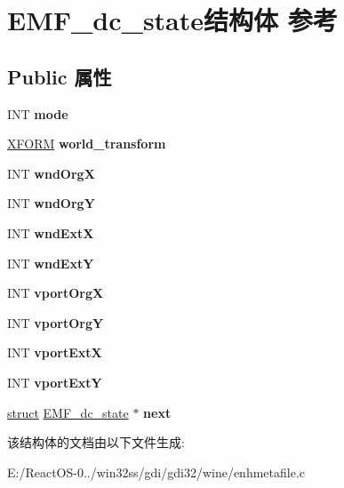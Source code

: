\hypertarget{struct_e_m_f__dc__state}{}\section{E\+M\+F\+\_\+dc\+\_\+state结构体 参考}
\label{struct_e_m_f__dc__state}
\subsection*{Public 属性}
\begin{DoxyCompactItemize}
\item 
\mbox{\label{struct_e_m_f__dc__state_a068c34e8fbc6623473db9846175bb7fc}} 
I\+NT {\bfseries mode}
\item 
\mbox{\label{struct_e_m_f__dc__state_a1cb0d6741104d85d34ed07bc413bef61}} 
\hyperlink{struct___x_f_o_r_m}{X\+F\+O\+RM} {\bfseries world\+\_\+transform}
\item 
\mbox{\label{struct_e_m_f__dc__state_a92bd05dad45251f5d6255bf887b168b1}} 
I\+NT {\bfseries wnd\+OrgX}
\item 
\mbox{\label{struct_e_m_f__dc__state_a00047ab307688a80dc7d419468928909}} 
I\+NT {\bfseries wnd\+OrgY}
\item 
\mbox{\label{struct_e_m_f__dc__state_aa8421f8d525a9caecd15b58ea4de8ce5}} 
I\+NT {\bfseries wnd\+ExtX}
\item 
\mbox{\label{struct_e_m_f__dc__state_aabf7bdb21bc24ec565fef1e065d5ac42}} 
I\+NT {\bfseries wnd\+ExtY}
\item 
\mbox{\label{struct_e_m_f__dc__state_acfd881a2608781c362b78a632667f545}} 
I\+NT {\bfseries vport\+OrgX}
\item 
\mbox{\label{struct_e_m_f__dc__state_a3bffd28254bd53b6412535a525194108}} 
I\+NT {\bfseries vport\+OrgY}
\item 
\mbox{\label{struct_e_m_f__dc__state_a4f08c86063e304ce9de209d250e8040a}} 
I\+NT {\bfseries vport\+ExtX}
\item 
\mbox{\label{struct_e_m_f__dc__state_a730c50ad4b27742206ef50e201cfd84c}} 
I\+NT {\bfseries vport\+ExtY}
\item 
\mbox{\label{struct_e_m_f__dc__state_a3194637ae650c4767ff478f19124f0f4}} 
\hyperlink{interfacestruct}{struct} \hyperlink{struct_e_m_f__dc__state}{E\+M\+F\+\_\+dc\+\_\+state} $\ast$ {\bfseries next}
\end{DoxyCompactItemize}


该结构体的文档由以下文件生成\+:\begin{DoxyCompactItemize}
\item 
E\+:/\+React\+O\+S-\/0../win32ss/gdi/gdi32/wine/enhmetafile.\+c\end{DoxyCompactItemize}
